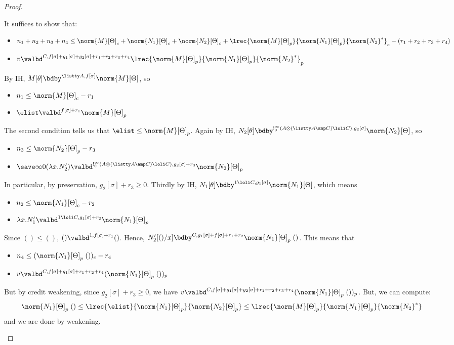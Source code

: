 \begin{proof}
\begin{itemize}
 It suffices to show that:
\begin{itemize}
  \item $n_1 + n_2 + n_3 + n_4 \leq \norm{M}[\Theta]_c + \norm{N_1}[\Theta]_c + \norm{N_2}[\Theta]_c + \lrec {\norm{M}[\Theta]_p} {\norm{N_1}[\Theta]_p} {\norm{N_2}^*}_c - (r_1 + r_2 + r_3 + r_4)$
  \item $v \valbd^{C,f[\sigma] + g_1[\sigma] + g_2[\sigma] + r_1 + r_2 + r_3 + r_4} \lrec {\norm{M}[\Theta]_p} {\norm{N_1}[\Theta]_p} {\norm{N_2}^*}_p$
\end{itemize}
By IH, $M[\theta] \bdby^{\listty A,f[\sigma]} \norm{M}[\Theta]$, so
\begin{itemize}
  \item $n_1 \leq \norm{M}[\Theta]_c - r_1$
  \item $\elist \valbd^{f[\sigma] + r_1} \norm{M}[\Theta]_p$
\end{itemize}
The second condition tells us that $\elist \leq \norm{M}[\Theta]_p$.
Again by IH, $N_2[\theta] \bdby^{!^\infty_0(A \otimes (\listty A \amp C) \loli C),g_2[\sigma]} \norm{N_2}[\Theta]$, so
\begin{itemize}
  \item $n_3 \leq \norm{N_2}[\Theta]_p - r_3$
  \item $\save \infty 0 {(\lambda x.N_2')} \valbd^{!^\infty_0(A \otimes (\listty A \amp C) \loli C),g_2[\sigma] + r_3} \norm{N_2}[\Theta]_p$
\end{itemize}
In particular, by preservation, $g_2[\sigma] + r_3 \geq 0$.
Thirdly by IH, $N_1[\theta] \bdby^{1 \loli C,g_1[\sigma]} \norm{N_1}[\Theta]$, which means
\begin{itemize}
  \item $n_2 \leq \norm{N_1}[\Theta]_c - r_2$
  \item $\lambda x.N_1' \valbd^{1 \loli C,g_1[\sigma] + r_2} \norm{N_1}[\Theta]_p$
\end{itemize}
Since $() \leq ()$, $() \valbd^{1,f[\sigma] + r_1} ()$. Hence, $N_2'[()/x] \bdby^{C,g_1[\sigma] + f[\sigma] + r_1 + r_2} \norm{N_1}[\Theta]_p \; ()$. This means that
\begin{itemize}
  \item $n_4 \leq (\norm{N_1}[\Theta]_p \; ())_c - r_4$
  \item $v \valbd^{C,f[\sigma] + g_1[\sigma] + r_1 + r_2 + r_4} (\norm{N_1}[\Theta]_p \; ())_p$
\end{itemize}
But by credit weakening, since $g_2[\sigma] + r_3 \geq 0$, we have 
$v \valbd^{C,f[\sigma] + g_1[\sigma] + g_2[\sigma] + r_1 + r_2 + r_3 + r_4} (\norm{N_1}[\Theta]_p \; ())_p$. But, we can compute:
$$
\norm{N_1}[\Theta]_p \; () \leq \lrec {\elist} {\norm{N_1}[\Theta]_p} {\norm{N_2}[\Theta]_p} \leq \lrec {\norm{M}[\Theta]_p} {\norm{N_1}[\Theta]_p} {\norm{N_2}^*}
$$
and we are done by weakening.\\



\end{itemize}
\end{proof}
